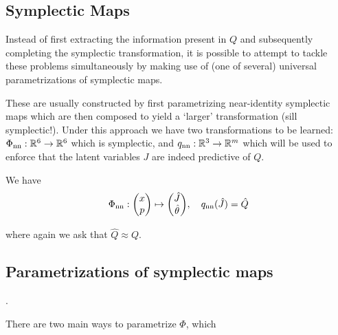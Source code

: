 \documentclass{article}
\begin{document}
\subsection{Symplectic Maps}

Instead of first extracting the information present in $Q$ and subsequently completing the symplectic transformation, it is possible to attempt to tackle these problems simultaneously by making use of (one of several) universal parametrizations of symplectic maps.

These are usually constructed by first parametrizing near-identity symplectic maps which are then composed to yield a `larger' transformation (sill symplectic!). Under this approach we have two transformations to be learned: $\Phi_\text{nn}:\mathbb{R}^6\to\mathbb{R}^6$ which is symplectic, and $q_\text{nn}:\mathbb{R}^3\to\mathbb{R}^m$ which will be used to enforce that the latent variables $J$ are indeed predictive of $Q$.

We have
\begin{align*}
    \Phi_\text{nn}:\mqty(x\\p)\mapsto\mqty(\hat{J}\\\hat{\theta})\qc q_\text{nn}(\hat{J})=\hat{Q}
\end{align*}

where again we ask that $\hat{Q}\approx Q$.

\subsection{Parametrizations of symplectic maps}.

There are two main ways to parametrize $\Phi$, which 
\end{document}

